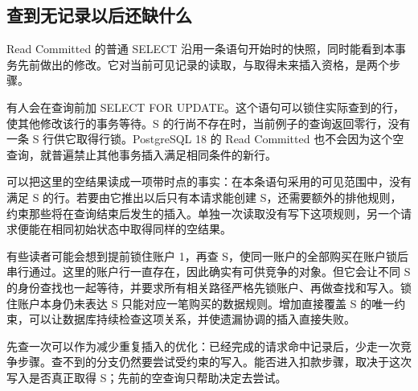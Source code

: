 \subsection*{查到无记录以后还缺什么}

Read Committed 的普通 SELECT 沿用一条语句开始时的快照，同时能看到本事务先前做出的修改\cite{pg}。它对当前可见记录的读取，与取得未来插入资格，是两个步骤。

有人会在查询前加 SELECT FOR UPDATE。这个语句可以锁住实际查到的行，使其他修改该行的事务等待。S 的行尚不存在时，当前例子的查询返回零行，没有一条 S 行供它取得行锁。PostgreSQL 18 的 Read Committed 也不会因为这个空查询，就普遍禁止其他事务插入满足相同条件的新行。



可以把这里的空结果读成一项带时点的事实：在本条语句采用的可见范围中，没有满足 S 的行。若要由它推出以后只有本请求能创建 S，还需要额外的排他规则，约束那些将在查询结束后发生的插入。单独一次读取没有写下这项规则，另一个请求便能在相同初始状态中取得同样的空结果。

有些读者可能会想到提前锁住账户 1，再查 S，使同一账户的全部购买在账户锁后串行通过。这里的账户行一直存在，因此确实有可供竞争的对象。但它会让不同 S 的身份查找也一起等待，并要求所有相关路径严格先锁账户、再做查找和写入。锁住账户本身仍未表达 S 只能对应一笔购买的数据规则。增加直接覆盖 S 的唯一约束，可以让数据库持续检查这项关系，并使遗漏协调的插入直接失败。

先查一次可以作为减少重复插入的优化：已经完成的请求命中记录后，少走一次竞争步骤。查不到的分支仍然要尝试受约束的写入。能否进入扣款步骤，取决于这次写入是否真正取得 S；先前的空查询只帮助决定去尝试。
\FloatBarrier
